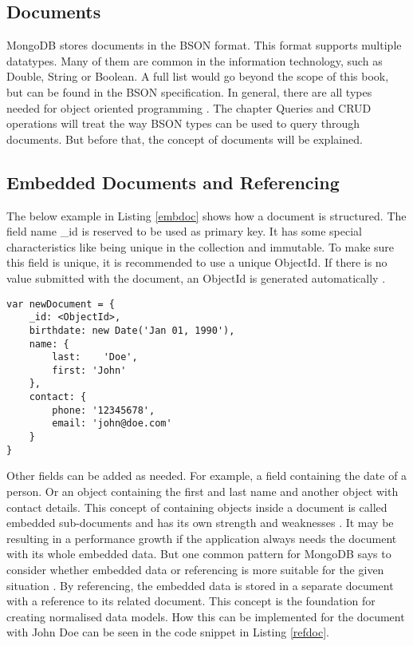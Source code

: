 \subsection{Documents}
MongoDB stores documents in the BSON format. This format supports multiple datatypes. Many of them are common in the information technology, such as Double, String or Boolean. A full list would go beyond the scope of this book, but can be found in the BSON specification. In general, there are all types needed for object oriented programming \cite{bsonspec}. The chapter Queries and CRUD operations will treat the way BSON types can be used to query through documents. But before that, the concept of documents will be explained.

\subsection{Embedded Documents and Referencing}
The below example in Listing \ref{embdoc} shows how a document is structured. The field name \_id is reserved to be used as primary key. It has some special characteristics like being unique in the collection and immutable. To make sure this field is unique, it is recommended to use a unique ObjectId. If there is no value submitted with the document, an ObjectId is generated automatically \cite{mdbdocu}. 

\begin{lstlisting}[frame=single, caption=Embedded Documents, label=embdoc]
var newDocument = {
	_id: <ObjectId>,
	birthdate: new Date('Jan 01, 1990'), 
	name: { 
        last:	 'Doe', 
        first: 'John' 
    },
	contact: {
		phone: '12345678',
		email: 'john@doe.com'
	}
}
\end{lstlisting}

Other fields can be added as needed. For example, a field containing the date of a person. Or an object containing the first and last name and another object with contact details. This concept of containing objects inside a document is called embedded sub-documents and has its own strength and weaknesses \cite{mdbdocu}. It may be resulting in a performance growth if the application always needs the document with its whole embedded data. But one common pattern for MongoDB says to consider whether embedded data or referencing is more suitable for the given situation \cite{mdbinaction}. By referencing, the embedded data is stored in a separate document with a reference to its related document. This concept is the foundation for creating normalised data models. How this can be implemented for the document with John Doe can be seen in the code snippet in Listing \ref{refdoc}.

